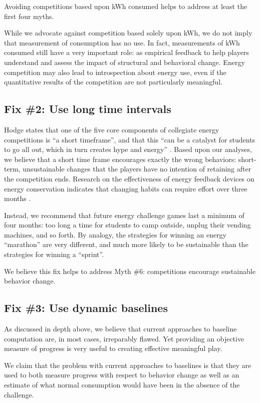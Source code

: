\documentclass[jou]{apa} %
\begin{document}
Avoiding competitions based upon kWh consumed helps to address at least the first four myths.

While we advocate against competition based solely upon kWh, we do not imply that measurement
of consumption has no use. In fact, measurements of kWh consumed still have a very important role:
as empirical feedback to help players understand and assess the impact of structural and
behavioral change. Energy competition may also lead to introspection about energy use, even
 if the quantitative results of the competition are not particularly meaningful.

\subsection{Fix \#2: Use long time intervals}

Hodge states that one of the five core components of collegiate energy competitions is
``a short timeframe'', and that this ``can be a catalyst for students to go all out, which
in turn creates hype and energy'' \cite{Hodge2010}. Based upon our analyses, we believe
that a short time frame encourages exactly the wrong behaviors:  short-term, unsustainable
changes that the players have no intention of retaining after the competition ends.
Research on the effectiveness of energy feedback devices on energy conservation indicates
that changing habits can require effort over three months \cite{darby-review-2006}.

Instead, we recommend that future energy challenge games last a minimum of four months:
too long a time for students to camp outside, unplug their vending machines, and so forth.
By analogy, the strategies for winning an energy ``marathon'' are very different, and much
more likely to be sustainable than the strategies for winning a ``sprint''.

We believe this fix helps to address Myth \#6: competitions encourage sustainable
behavior change.

\subsection{Fix \#3: Use dynamic baselines}

As discussed in depth above, we believe that current approaches to baseline computation
are, in most cases, irreparably flawed.  Yet providing an objective measure of progress is
very useful to creating effective meaningful play.  

We claim that the problem with current approaches to baselines is that they are used to
both measure progress with respect to behavior change as well as an estimate of what
normal consumption would have been in the absence of the challenge.
\end{document}
